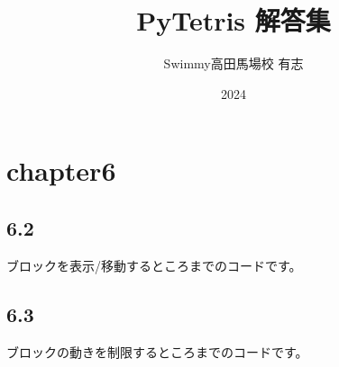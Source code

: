 \documentclass[12pt, a4paper, dvipdfmx]{jarticle}
\title{PyTetris 解答集}
\author{Swimmy高田馬場校 有志}
\date{2024}
\begin{document}
\maketitle

\section{chapter6}
\subsection{6.2}
ブロックを表示/移動するところまでのコードです。



\subsection{6.3}
ブロックの動きを制限するところまでのコードです。


\end{document}
